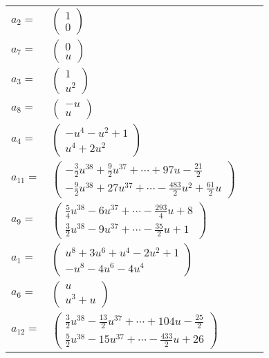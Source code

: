 \documentclass[1p]{elsarticle_modified}
\theoremstyle{definition}
\begin{document}
\begin{tabular}{m{7pt} m{180pt} m{7pt} m{180pt} }
\flushright $a_{2}=$&$\begin{pmatrix}1\\0\end{pmatrix}$ \\
\flushright $a_{7}=$&$\begin{pmatrix}0\\u\end{pmatrix}$ \\
\flushright $a_{3}=$&$\begin{pmatrix}1\\u^2\end{pmatrix}$ \\
\flushright $a_{8}=$&$\begin{pmatrix}- u\\u\end{pmatrix}$ \\
\flushright $a_{4}=$&$\begin{pmatrix}- u^4- u^2+1\\u^4+2 u^2\end{pmatrix}$ \\
\flushright $a_{11}=$&$\begin{pmatrix}-\frac{3}{2} u^{38}+\frac{9}{2} u^{37}+\cdots+97 u-\frac{21}{2}\\-\frac{9}{2} u^{38}+27 u^{37}+\cdots-\frac{483}{2} u^2+\frac{61}{2} u\end{pmatrix}$ \\
\flushright $a_{9}=$&$\begin{pmatrix}\frac{5}{4} u^{38}-6 u^{37}+\cdots-\frac{293}{4} u+8\\\frac{3}{2} u^{38}-9 u^{37}+\cdots-\frac{35}{2} u+1\end{pmatrix}$ \\
\flushright $a_{1}=$&$\begin{pmatrix}u^8+3 u^6+u^4-2 u^2+1\\- u^8-4 u^6-4 u^4\end{pmatrix}$ \\
\flushright $a_{6}=$&$\begin{pmatrix}u\\u^3+u\end{pmatrix}$ \\
\flushright $a_{12}=$&$\begin{pmatrix}\frac{3}{2} u^{38}-\frac{13}{2} u^{37}+\cdots+104 u-\frac{25}{2}\\\frac{5}{2} u^{38}-15 u^{37}+\cdots-\frac{433}{2} u+26\end{pmatrix}$ \\

\end{tabular}
\end{document}
